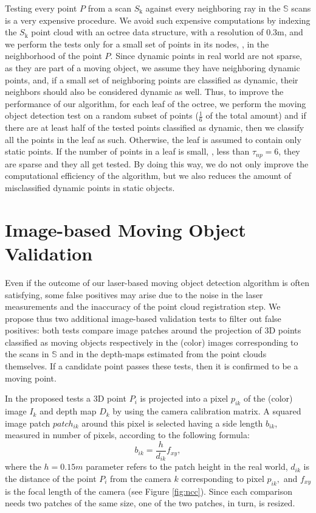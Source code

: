 Testing every point $P$ from a scan $S_{\text{k}}$ against every neighboring ray in the $\mathbb{S}$ scans is a very expensive procedure. 
We avoid such expensive computations by indexing the $S_{\text{k}}$ point cloud with an octree data structure, with a resolution of 0.3m, and we perform the tests only for a small set of points in its nodes, \ie, in the neighborhood of the point $P$.
Since dynamic points in real world are not sparse, as they are part of a moving object, we assume they have neighboring dynamic points, and, if a small set of neighboring points are classified as dynamic, their neighbors should also be considered dynamic as well. 
Thus, to improve the performance of our algorithm, for each leaf of the octree, we perform the moving object detection test on a random subset of points ($\frac{1}{6}$ of the total amount) and if there are at least half of the tested points classified as dynamic, then we classify all the points in the leaf as such. Otherwise, the leaf is assumed to contain only static points.
If the number of points in a leaf is small, \ie, less than $\tau_{np}=6$, they are sparse and they all get tested. By doing this way, we do not only improve the computational efficiency of the algorithm, but we also reduces the amount of misclassified dynamic points in static objects.


\section{Image-based Moving Object Validation}%
\label{sec:images}
Even if the outcome of our laser-based moving object detection algorithm is often satisfying, some false positives may arise due to the noise in the laser measurements and the inaccuracy of the point cloud registration step. 
We propose thus two additional image-based validation tests to filter out false positives: both tests compare image patches around the projection of 3D points classified as moving objects respectively in the (color) images corresponding to the scans in $\mathbb{S}$ and in the depth-maps estimated from the point clouds themselves. If a candidate point passes these tests, then it is confirmed to be a moving point.

In the proposed tests a 3D point $P_i$ is projected into a pixel $p_{ik}$ of the (color) image $I_k$ and depth map $D_k$ by using the camera calibration matrix. A squared image patch $patch_{ik}$ around this pixel is selected having a side length $b_{ik}$, measured in number of pixels, according to the following formula:
\begin{equation}
 b_{ik} = \frac{h}{d_{ik}}f_{xy},
\end{equation}
where the $h=0.15m$ parameter refers to the patch height in the real world, $d_{ik}$ is the distance of the point $P_i$ from the camera $k$ corresponding to pixel $p_{ik},$ and $f_{xy}$ is the focal length of the camera (see Figure \ref{fig:ncc}).
Since each comparison needs two patches of the same size, one of the two patches, in turn, is resized.

